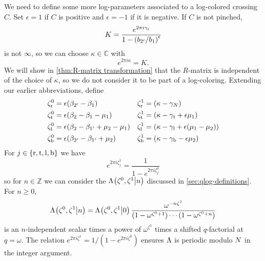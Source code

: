 \documentclass{sl2ams}
\numberwithin{equation}{section}
\newcommand{\ZZ}{\mathbb{Z}}
\begin{document}
We need to define some more log-parameters associated to a log-colored crossing \(C\).
Set \(\epsilon = 1\) if \(C\) is positive and \(\epsilon = -1\) if it is negative.
If \(C\) is not pinched, 
\begin{equation*}
  K= 
  \frac{e^{2\pi i \gamma_{\mathrm{r}}}}{1 - \left(b_{2'}/b_{1}\right)^{\epsilon}}
\end{equation*}
is not \(\infty\), so we can choose \(\kappa \in \mathbb{C}\) with
\[
  e^{2\pi i \kappa} = K.
\]
We will show in \cref{thm:R-matrix transformation} that the \(R\)-matrix is independent of the choice of \(\kappa\), so we do not consider it to be part of a log-coloring.
Extending our earlier abbreviations, define
  \begin{align}
    \label{eq:flattening-N}
    \zeta_{\mathrm{r}}^0
    &=
    \epsilon (\beta_{2'} - \beta_1)
    &
    \zeta_{\mathrm{r}}^1
    &=
    ( \kappa - \gamma_N)
    \\
    \label{eq:flattening-W}
    \zeta_{\mathrm{t}}^0
    &=
    \epsilon(\beta_{2} - \beta_{1} - \mu_1 )
    &
    \zeta_{\mathrm{t}}^1
    &=
    ( \kappa - \gamma_{\mathrm{t}} + \epsilon \mu_1)
    \\
    \label{eq:flattening-S}
    \zeta_{\mathrm{l}}^0
    &=
    \epsilon(\beta_{2} - \beta_{1'} + \mu_2 - \mu_1 )
    &
    \zeta_{\mathrm{l}}^1
    &=
    (\kappa - \gamma_{\mathrm{l}} + \epsilon (\mu_1 - \mu_2))
    \\
    \label{eq:flattening-E}
    \zeta_{\mathrm{b}}^0
    &=
    \epsilon(\beta_{2'} - \beta_{1'} + \mu_2 )
    &
    \zeta_{\mathrm{b}}^1
    &=
    ( \kappa - \gamma_{\mathrm{b}} - \epsilon \mu_2)
  \end{align}
For \(j \in \set{{\lN}, {\lW}, {\lS}, {\lE}}\) we have
\[
  e^{2\pi i \zeta_j^1} = 
  \frac{
    1
    }{
    1 - e^{2\pi i \zeta_j^0}
  }
\]
so for \(n \in \ZZ\) we can consider the 
\(
  \qlf{\zeta^0, \zeta^1}{n}
\)
discussed in \cref{sec:qlog-definitions}.
For \(n \ge 0\),
\begin{equation}
  \label{eq:qlf recurrence}
  \qlf{\zeta^0, \zeta^1}{n}
  =
  \qlf{\zeta^0, \zeta^1}{0}
  \frac{
    \omega^{-n\zeta^1}
  }{
    (1 - \omega^{\zeta^0 + 1})
    \cdots
    (1 - \omega^{\zeta^0 + n})
  }
\end{equation}
is an \(n\)-independent scalar times a power of \(\omega^{\zeta^1}\) times a shifted \(q\)-factorial at \(q = \omega\).
The relation \(e^{2\pi i \zeta^1} = 1/(1 - e^{2\pi i \zeta^0})\) ensures \(\Lambda\) is periodic modulo \(N\) in the integer argument.
\end{document}
